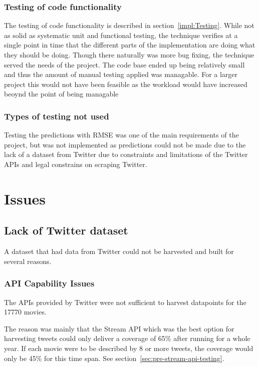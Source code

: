 \subsubsection{Testing of code functionality}
The testing of code functionality is described in section~\ref{impl:Testing}. While not as solid as systematic unit and functional testing, the technique verifies at a single point in time that the different parts of the implementation are doing what they should be doing. Though there naturally was more bug fixing, the technique served the needs of the project. The code base ended up being relatively small and thus the amount of manual testing applied was managable. For a larger project this would not have been feasible as the workload would have increased beoynd the point of being managable

\subsubsection{Types of testing not used}
Testing the predictions with RMSE was one of the main requirements of the project, but was not implemented as predictions could not be made due to the lack of a dataset from Twitter due to constraints and limitations of the Twitter APIs and legal constrains on scraping Twitter.

\section{Issues}\label{sec:issues}

\subsection*{Lack of Twitter dataset}
A dataset that had data from Twitter could not be harvested and built for several reasons.

\subsubsection{API Capability Issues}
The APIs provided by Twitter were not sufficient to harvest datapoints for the 17770 movies.

The reason was mainly that the Stream API which was the best option for harvesting tweets could only deliver a coverage of 65\% after running for a whole year. If each movie were to be described by 8 or more tweets, the coverage would only be 45\% for this time span. See section~\ref{sec:pre-stream-api-testing}.

